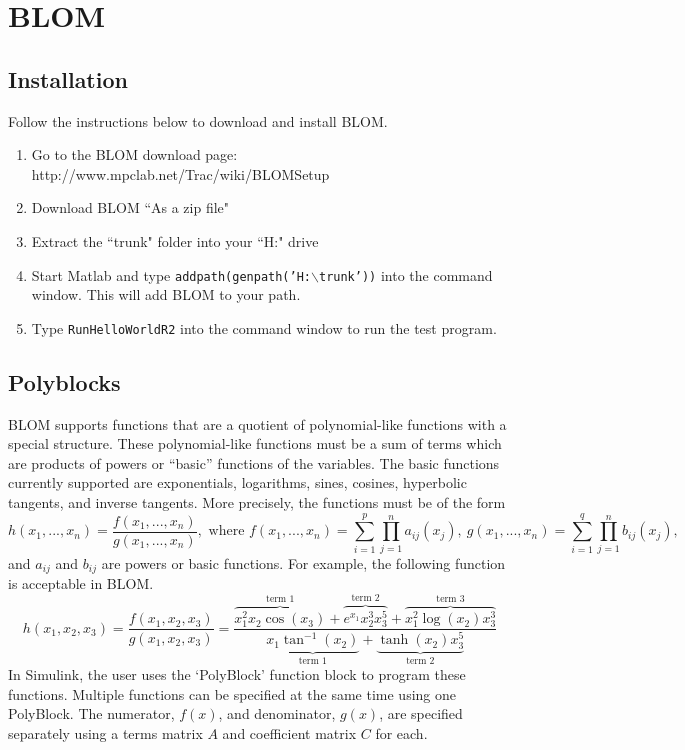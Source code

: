 \documentclass{article}
\begin{document}
\section{BLOM}
\subsection{Installation}
Follow the instructions below to download and install BLOM.
\begin{enumerate}
\item Go to the BLOM download page: http://www.mpclab.net/Trac/wiki/BLOMSetup
\item Download BLOM ``As a zip file"
\item Extract the ``trunk" folder into your ``H:" drive
\item Start Matlab and type \texttt{addpath(genpath('H:$\backslash$trunk'))} into the command window. This will add BLOM to your path.
\item Type \texttt{RunHelloWorldR2} into the command window to run the test program.
\end{enumerate}
\subsection{Polyblocks}
BLOM supports functions that are a quotient of polynomial-like functions with a special structure. These polynomial-like functions must be a sum of terms which are products of powers or ``basic'' functions of the variables. The basic functions currently supported are exponentials, logarithms, sines, cosines, hyperbolic tangents, and inverse tangents. More precisely, the functions must be of the form
\[h(x_1,...,x_n)=\frac{f(x_1,...,x_n)}{g(x_1,...,x_n)},\text{ where }f(x_1,...,x_n)=\sum_{i=1}^p \prod_{j=1}^n a_{ij}(x_j),\:g(x_1,...,x_n)=\sum_{i=1}^q \prod_{j=1}^n b_{ij}(x_j),\]
and $a_{ij}$ and $b_{ij}$ are powers or basic functions.
For example, the following function is acceptable in BLOM.
\[h(x_1,x_2,x_3)=\frac{f(x_1,x_2,x_3)}{g(x_1,x_2,x_3)}=\frac{\overbrace{x_1^2x_2\cos(x_3)}^{\text{term 1}}+\overbrace{e^{x_1}x_2^3x_3^5}^{\text{term 2}}+\overbrace{x_1^2\log (x_2)x_3^3}^{\text{term 3}}}{\underbrace{x_1\tan^{-1}(x_2)}_{\text{term 1}}+\underbrace{\tanh(x_2)x_3^5}_\text{term 2}}\]
In Simulink, the user uses the `PolyBlock' function block to program these functions. Multiple functions can be specified at the same time using one PolyBlock. The numerator, $f(x)$, and denominator, $g(x)$, are specified separately using a terms matrix $A$ and coefficient matrix $C$ for each.
\end{document}
